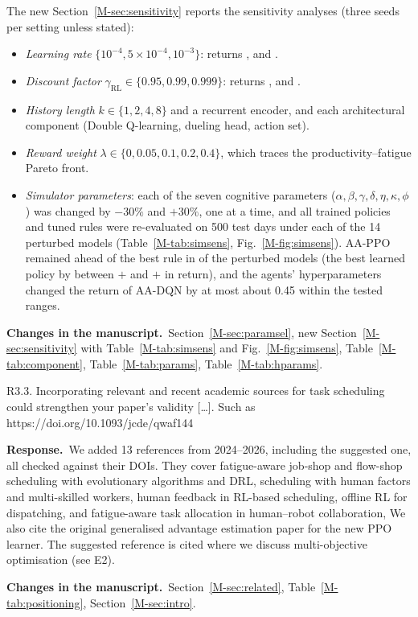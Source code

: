 \documentclass[11pt]{article}
\newcommand{\resp}{\par\smallskip\noindent\textbf{Response.}~}
\newcommand{\change}{\par\smallskip\noindent\textbf{Changes in the manuscript.}~}
\newcommand{\Sec}[1]{Section~\ref{M-#1}}
\newcommand{\Tab}[1]{Table~\ref{M-#1}}
\newcommand{\Fig}[1]{Fig.~\ref{M-#1}}
\begin{document}
The new \Sec{sec:sensitivity} reports the sensitivity analyses (three seeds per setting unless stated):
\begin{itemize}
\item \emph{Learning rate} $\{10^{-4}, 5\times10^{-4}, 10^{-3}\}$: returns \compAADQNLrOneeFourRet, \compAADQNRet{} and \compAADQNLrOneeThreeRet.
\item \emph{Discount factor} $\gamma_{\mathrm{RL}}\in\{0.95,0.99,0.999\}$: returns \compAADQNGZeroNineFiveRet, \compAADQNRet{} and \compAADQNGZeroNineNineNineRet.
\item \emph{History length} $k\in\{1,2,4,8\}$ and a recurrent encoder, and each architectural component (Double Q-learning, dueling head, action set).
\item \emph{Reward weight} $\lambda\in\{0,0.05,0.1,0.2,0.4\}$, which traces the productivity--fatigue Pareto front.
\item \emph{Simulator parameters}: each of the seven cognitive parameters ($\alpha,\beta,\gamma,\delta,\eta,\kappa,\phi$) was changed by $-30\%$ and $+30\%$, one at a time, and all trained policies and tuned rules were re-evaluated on 500 test days under each of the 14 perturbed models (\Tab{tab:simsens}, \Fig{fig:simsens}). AA-PPO remained ahead of the best rule in \ssPPOWins{} of the \ssNConds{} perturbed models (the best learned policy by between $+$\ssGapMin{} and $+$\ssGapMax{} in return), and the agents' hyperparameters changed the return of AA-DQN by at most about 0.45 within the tested ranges.
\end{itemize}
\change \Sec{sec:paramsel}, new \Sec{sec:sensitivity} with \Tab{tab:simsens} and \Fig{fig:simsens}, \Tab{tab:component}, \Tab{tab:params}, \Tab{tab:hparams}.

\begin{rcomment}{R3.3.}
Incorporating relevant and recent academic sources for task scheduling could strengthen your paper's validity [\dots]. Such as https://doi.org/10.1093/jcde/qwaf144
\end{rcomment}
\resp We added 13 references from 2024--2026, including the suggested one, all checked against their DOIs. They cover fatigue-aware job-shop and flow-shop scheduling with evolutionary algorithms and DRL, scheduling with human factors and multi-skilled workers, human feedback in RL-based scheduling, offline RL for dispatching, and fatigue-aware task allocation in human--robot collaboration, We also cite the original generalised advantage estimation paper for the new PPO learner. The suggested reference is cited where we discuss multi-objective optimisation (see E2).
\change \Sec{sec:related}, \Tab{tab:positioning}, \Sec{sec:intro}.
\end{document}
